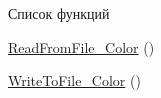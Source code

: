 {\ttfamily Список} функций
\begin{DoxyItemize}
\item \mbox{\hyperlink{_r___w___color__in__from__file_8h_affd1cb1740571ed7d67f7836cf808f47}{Read\+From\+File\+\_\+\+Color}} ()
\item \mbox{\hyperlink{_r___w___color__in__from__file_8h_a1db05b30e5d8ae2934bb8cdcbab7af78}{Write\+To\+File\+\_\+\+Color}} () 
\end{DoxyItemize}